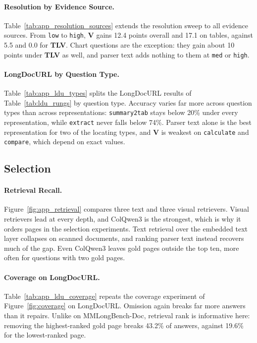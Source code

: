 \paragraph{Resolution by Evidence Source.}
Table~\ref{tab:app_resolution_sources} extends the resolution sweep to all evidence sources. From \texttt{low} to \texttt{high}, \textbf{V} gains 12.4 points overall and 17.1 on tables, against 5.5 and 0.0 for \textbf{TLV}. Chart questions are the exception: they gain about 10 points under \textbf{TLV} as well, and parser text adds nothing to them at \texttt{med} or \texttt{high}.

\paragraph{LongDocURL by Question Type.}
Table~\ref{tab:app_ldu_types} splits the LongDocURL results of Table~\ref{tab:ldu_rungs} by question type. Accuracy varies far more across question types than across representations: \texttt{summary2tab} stays below 20\% under every representation, while \texttt{extract} never falls below 74\%. Parser text alone is the best representation for two of the locating types, and \textbf{V} is weakest on \texttt{calculate} and \texttt{compare}, which depend on exact values.

\subsection{Selection}
\label{app:results_selection}

\paragraph{Retrieval Recall.}
Figure~\ref{fig:app_retrieval} compares three text and three visual retrievers. Visual retrievers lead at every depth, and ColQwen3 is the strongest, which is why it orders pages in the selection experiments. Text retrieval over the embedded text layer collapses on scanned documents, and ranking parser text instead recovers much of the gap. Even ColQwen3 leaves gold pages outside the top ten, more often for questions with two gold pages.

\paragraph{Coverage on LongDocURL.}
Table~\ref{tab:app_ldu_coverage} repeats the coverage experiment of Figure~\ref{fig:coverage} on LongDocURL. Omission again breaks far more answers than it repairs. Unlike on MMLongBench-Doc, retrieval rank is informative here: removing the highest-ranked gold page breaks 43.2\% of answers, against 19.6\% for the lowest-ranked page.

